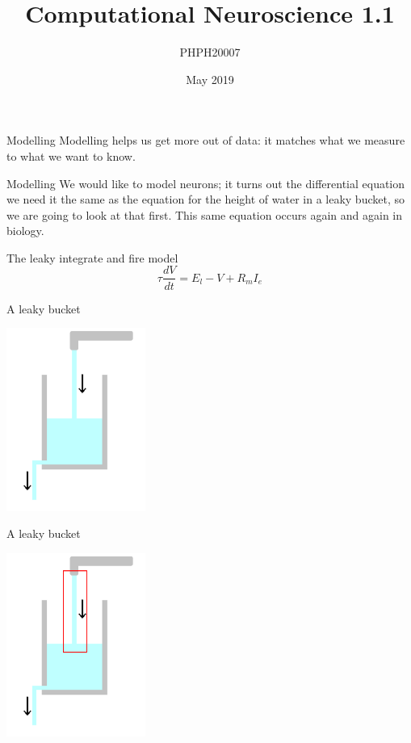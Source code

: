 \documentclass{beamer}
\title[Computational Neuroscience 1.1]{Computational Neuroscience 1.1}
\author{PHPH20007}
\institute{\texttt{github.com/conorhoughton/PHPH20007}}
\date{May 2019}
\begin{document}
\maketitle

\begin{frame}{Modelling}
  Modelling helps us get more out of data: it matches what we measure to what we want to know.
  \end{frame}


\begin{frame}{Modelling}
We would like to model neurons; it turns out the differential equation
we need it the same as the equation for the height of water in a leaky
bucket, so we are going to look at that first. This same equation occurs again and again in biology.
  \end{frame}


\begin{frame}{The leaky integrate and fire model}
\color{black}
\color{reddish}
$$
\tau \frac{dV}{dt}=E_l-V+R_mI_e
$$
\color{black}
\end{frame}

\begin{frame}{A leaky bucket}

  \begin{center}
    \includegraphics[height=6cm]{glass.png}
  \end{center}
  
  
\end{frame}



\begin{frame}{A leaky bucket}

  \begin{center}
    \includegraphics[height=6cm]{glass_in.png}
  \end{center}
  
  
\end{frame}
\end{document}
